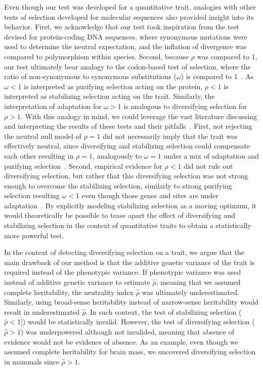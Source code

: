 \documentclass{article}
\newcommand{\dnds}{\omega}
\newcommand{\NI}{\rho}
\newcommand{\EstNI}{\widehat{\rho}}
\begin{document}
Even though our test was developed for a quantitative trait, analogies with other tests of selection developed for molecular sequences also provided insight into its behavior.
First, we acknowledge that our test took inspiration from the \textcite{mcdonald_adaptative_1991} test devised for protein-coding DNA sequences, where synonymous mutations were used to determine the neutral expectation, and the inflation of divergence was compared to polymorphism within species.
Second, because $\NI$ was compared to 1, our test ultimately bear analogy to the codon-based test of selection, where the ratio of non-synonymous to synonymous substitutions ($\dnds$) is compared to 1~\parencite{goldman_codonbased_1994, muse_likelihood_1994}.
As $\dnds < 1$ is interpreted as purifying selection acting on the protein, $\NI < 1$ is interpreted as stabilizing selection acting on the trait.
Similarly, the interpretation of adaptation for $\dnds > 1$ is analogous to diversifying selection for $\NI > 1$.
With this analogy in mind, we could leverage the vast literature discussing and interpreting the results of these tests and their pitfalls~\parencite{nielsen_molecular_2005, anisimova_investigating_2009, jensen_importance_2019}.
First, not rejecting the neutral null model of $\NI = 1$ did not necessarily imply that the trait was effectively neutral, since diversifying and stabilizing selection could compensate each other resulting in $\NI = 1$, analogously to $\dnds=1$ under a mix of adaptation and purifying selection~\parencite{nielsen_molecular_2005}.
Second, empirical evidence for $\NI < 1$ did not rule out diversifying selection, but rather that this diversifying selection was not strong enough to overcome the stabilizing selection, similarly to strong purifying selection resulting $\dnds < 1$ even though those genes and sites are under adaptation~\parencite{latrille_genes_2023}.
By explicitly modeling stabilizing selection as a moving optimum, it would theoretically be possible to tease apart the effect of diversifying and stabilizing selection in the context of quantitative traits to obtain a statistically more powerful test.

In the context of detecting diversifying selection on a trait, we argue that the main drawback of our method is that the additive genetic variance of the trait is required instead of the phenotypic variance.
If phenotypic variance was used instead of additive genetic variance to estimate $\EstNI$, meaning that we assumed complete heritability, the neutrality index $\EstNI$ was ultimately underestimated.
Similarly, using broad-sense heritability instead of narrow-sense heritability would result in underestimated $\EstNI$.
In such context, the test of stabilizing selection ($\EstNI < 1]$) would be statistically invalid.
However, the test of diversifying selection ($\EstNI > 1$) was underpowered although not invalided, meaning that absence of evidence would not be evidence of absence.
As an example, even though we assumed complete heritability for brain mass, we uncovered diversifying selection in mammals since $\EstNI > 1$.
\end{document}

